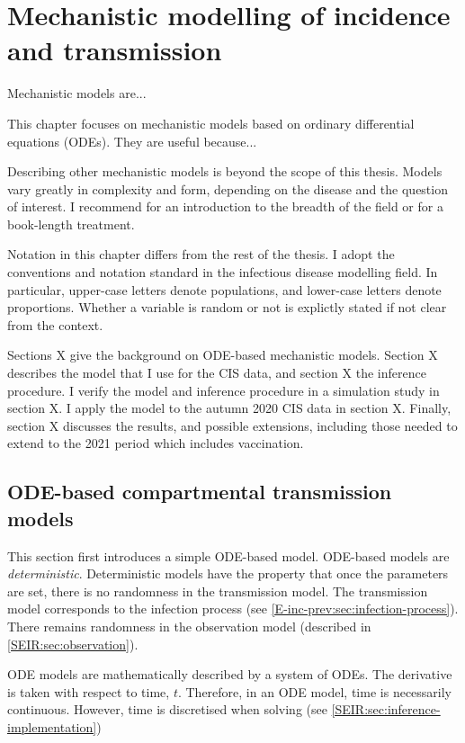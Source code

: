 \documentclass[thesis.tex]{subfiles}
\begin{document}
\chapter{Mechanistic modelling of incidence and transmission} \label{SEIR}

Mechanistic models are...

This chapter focuses on mechanistic models based on ordinary differential equations (ODEs).
They are useful because...

Describing other mechanistic models is beyond the scope of this thesis.
Models vary greatly in complexity and form, depending on the disease and the question of interest.
I recommend \Textcite{kretzschmarMathematical} for an introduction to the breadth of the field or \Textcite{keelingModeling} for a book-length treatment.

Notation in this chapter differs from the rest of the thesis.
I adopt the conventions and notation standard in the infectious disease modelling field.
In particular, upper-case letters denote populations, and lower-case letters denote proportions.
Whether a variable is random or not is explictly stated if not clear from the context.

Sections X give the background on ODE-based mechanistic models.
Section X describes the model that I use for the CIS data, and section X the inference procedure.
I verify the model and inference procedure in a simulation study in section X.
I apply the model to the autumn 2020 CIS data in section X.
Finally, section X discusses the results, and possible extensions, including those needed to extend to the 2021 period which includes vaccination.

\section{ODE-based compartmental transmission models} \label{SEIR:sec:transmission}

This section first introduces a simple ODE-based model.
ODE-based models are \emph{deterministic}.
Deterministic models have the property that once the parameters are set, there is no randomness in the transmission model.
The transmission model corresponds to the infection process (see \cref{E-inc-prev:sec:infection-process}).
There remains randomness in the observation model (described in \cref{SEIR:sec:observation}).

ODE models are mathematically described by a system of ODEs.
The derivative is taken with respect to time, $t$.
Therefore, in an ODE model, time is necessarily continuous.
However, time is discretised when solving (see \cref{SEIR:sec:inference-implementation})
\end{document}
